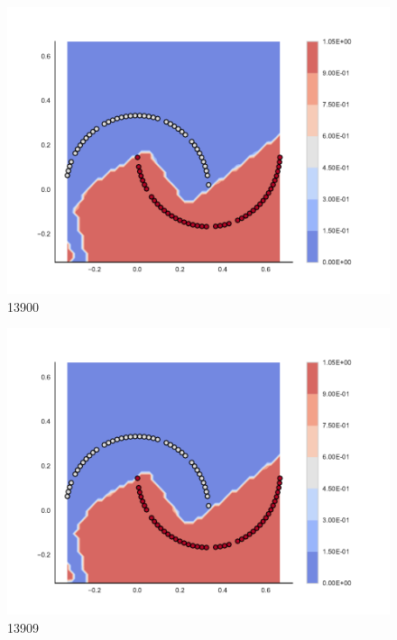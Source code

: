 \begin{subfigure}[b]{0.09\textwidth}
    \includegraphics[clip, trim=2.35cm 1.75cm 4.5cm 0cm,width=\textwidth]{img/convergence/13900.pdf}
    \caption{13900}
    \label{fig:convergence_13900}
\end{subfigure}
%
\begin{subfigure}[b]{0.09\textwidth}
    \includegraphics[clip, trim=2.35cm 1.75cm 4.5cm 0cm,width=\textwidth]{img/convergence/13909.pdf}
    \caption{13909}
    \label{fig:convergence_13909}
\end{subfigure}
%
